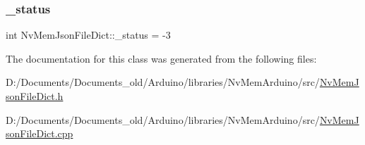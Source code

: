 \mbox{\label{class_nv_mem_json_file_dict_aa6a81cbcf5023df029ad661d98a7cdfb}} 
\subsubsection{\texorpdfstring{\_status}{\_status}}
{\footnotesize\ttfamily int Nv\+Mem\+Json\+File\+Dict\+::\+\_\+status = -\/3\hspace{0.3cm}{\ttfamily [protected]}}



The documentation for this class was generated from the following files\+:\begin{DoxyCompactItemize}
\item 
D\+:/\+Documents/\+Documents\+\_\+old/\+Arduino/libraries/\+Nv\+Mem\+Arduino/src/\mbox{\hyperlink{_nv_mem_json_file_dict_8h}{Nv\+Mem\+Json\+File\+Dict.\+h}}\item 
D\+:/\+Documents/\+Documents\+\_\+old/\+Arduino/libraries/\+Nv\+Mem\+Arduino/src/\mbox{\hyperlink{_nv_mem_json_file_dict_8cpp}{Nv\+Mem\+Json\+File\+Dict.\+cpp}}\end{DoxyCompactItemize}
